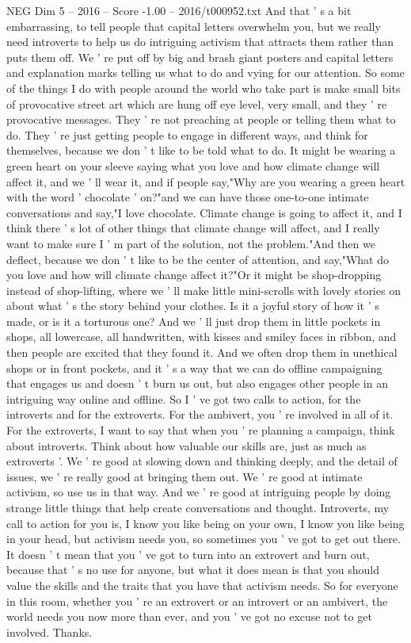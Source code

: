 \begin{textsample}{NEG Dim 5 – 2016 – Score -1.00 – 2016/t000952.txt}
And that ' s a bit embarrassing, to tell people that capital letters overwhelm you, but we really need introverts to help us do intriguing activism that attracts them rather than puts them off.
We ' re put off by big and brash giant posters and capital letters and explanation marks telling us what to do and vying for our attention.
So some of the things I do with people around the world who take part is make small bits of provocative street art which are hung off eye level, very small, and they ' re provocative messages.
They ' re not preaching at people or telling them what to do.
They ' re just getting people to engage in different ways, and think for themselves, because we don ' t like to be told what to do.
It might be wearing a green heart on your sleeve saying what you love and how climate change will affect it, and we ' ll wear it, and if people say,"Why are you wearing a green heart with the word ' chocolate ' on?"and we can have those one-to-one intimate conversations and say,"I love chocolate.
Climate change is going to affect it, and I think there ' s lot of other things that climate change will affect, and I really want to make sure I ' m part of the solution, not the problem."And then we deflect, because we don ' t like to be the center of attention, and say,"What do you love and how will climate change affect it?"Or it might be shop-dropping instead of shop-lifting, where we ' ll make little mini-scrolls with lovely stories on about what ' s the story behind your clothes.
Is it a joyful story of how it ' s made, or is it a torturous one?
And we ' ll just drop them in little pockets in shops, all lowercase, all handwritten, with kisses and smiley faces in ribbon, and then people are excited that they found it.
And we often drop them in unethical shops or in front pockets, and it ' s a way that we can do offline campaigning that engages us and doesn ' t burn us out, but also engages other people in an intriguing way online and offline.
So I ' ve got two calls to action, for the introverts and for the extroverts.
For the ambivert, you ' re involved in all of it.
For the extroverts, I want to say that when you ' re planning a campaign, think about introverts.
Think about how valuable our skills are, just as much as extroverts '.
We ' re good at slowing down and thinking deeply, and the detail of issues, we ' re really good at bringing them out.
We ' re good at intimate activism, so use us in that way.
And we ' re good at intriguing people by doing strange little things that help create conversations and thought.
Introverts, my call to action for you is, I know you like being on your own, I know you like being in your head, but activism needs you, so sometimes you ' ve got to get out there.
It doesn ' t mean that you ' ve got to turn into an extrovert and burn out, because that ' s no use for anyone, but what it does mean is that you should value the skills and the traits that you have that activism needs.
So for everyone in this room, whether you ' re an extrovert or an introvert or an ambivert, the world needs you now more than ever, and you ' ve got no excuse not to get involved.
Thanks.

\end{textsample}
